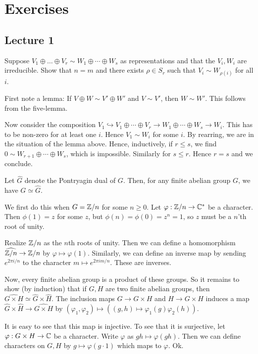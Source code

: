\documentclass[11pt, english]{article}
\begin{document}
\section{Exercises}

\subsection{Lecture 1}
\begin{exc}
Suppose $V_1 \oplus \ldots \oplus V_r \sim W_1 \oplus \cdots \oplus W_s$ as representations and that the $V_i,W_i$ are irreducible. Show that $n=m$ and there exists $\rho \in S_r$ such that $V_i \sim W_{\rho(i)}$ for all $i$.
\end{exc}
\begin{sol}
First note a lemma: If $V \oplus W \sim V' \oplus W'$ and $V \sim V'$, then $W \sim W'$. This follows from the five-lemma.

Now consider the composition $V_1 \hookrightarrow V_1 \oplus \cdots \oplus V_r  \to W_1 \oplus \cdots \oplus W_s \to W_i$. This has to be non-zero for at least one $i$. Hence $V_1 \sim W_i$ for some $i$. By rearring, we are in the situation of the lemma above. Hence, inductively, if $r \leq s$, we find $0 \sim W_{r+1} \oplus \cdots \oplus W_s$, which is impossible. Similarly for $s \leq r$. Hence $r=s$ and we conclude.
\end{sol}

\begin{exc}
 Let $\hat G$ denote the Pontryagin dual of $G$. Then, for any finite abelian group $G$, we have $G \simeq \hat G$.
\end{exc}
\begin{sol}
We first do this when $G= \mathbb{Z}/n$ for some $n \geq 0$. Let $\varphi:\mathbb{Z}/n \to \mathbb{C}^\ast$ be a character. Then $\phi(1)=z$ for some $z$, but $\phi(n)=\phi(0)=z^n=1$, so $z$ must be a $n$'th root of unity.

Realize $\mathbb{Z}/n$ as the $n$th roots of unity. Then we can define a homomorphism $\widehat {\mathbb{Z}/n} \to \mathbb{Z}/n$ by $\varphi \mapsto \varphi(1)$. Similarly, we can define an inverse map by sending $e^{2\pi i/n}$  to the character $m \mapsto e^{2\pi i m /n}$. These are inverses.

Now, every finite abelian group is a product of these groups. So it remains to show (by induction) that if $G,H$ are two finite abelian groups, then $\widehat {G \times H} \simeq \widehat G \times \widehat H$. The inclusion maps $G \to G \times H$ and $H \to G \times H$ induces a map $\widehat G \times \widehat H \to \widehat{G \times H}$ by $(\varphi_1, \varphi_2) \mapsto ((g,h) \mapsto \varphi_1(g)\varphi_2(h))$.

It is easy to see that this map is injective. To see that it is surjective, let $\varphi:G \times H \to \mathbb{C}$ be a character. Write $\varphi$ as $gh \mapsto \varphi(gh)$. Then we can define characters on $G,H$ by $g \mapsto \varphi(g \cdot 1)$ which maps to $\varphi$. Ok.
\end{sol}
\end{document}
